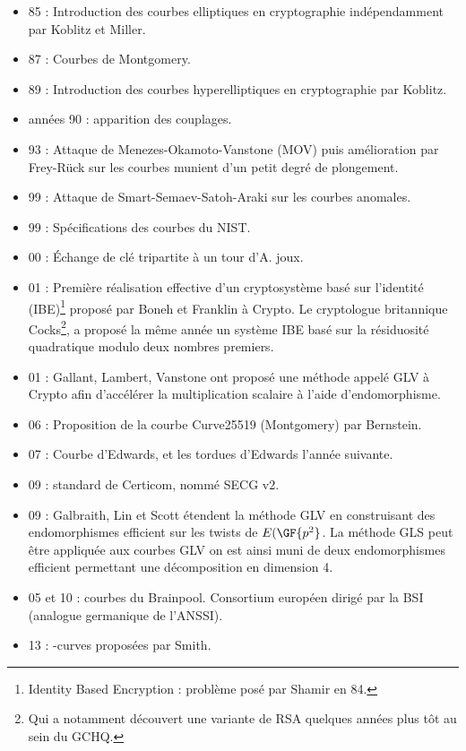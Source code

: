 \begin{itemize}
\item 85 : Introduction des courbes elliptiques en cryptographie indépendamment par Koblitz et Miller.
\item 87 : Courbes de Montgomery.
\item 89 : Introduction des courbes hyperelliptiques en cryptographie par Koblitz.
\item années 90 : apparition des couplages.
\item 93 : Attaque de Menezes-Okamoto-Vanstone (MOV) puis amélioration par Frey-Rück sur les courbes munient d'un petit degré de plongement.
\item 99 : Attaque de Smart-Semaev-Satoh-Araki sur les courbes anomales.
\item 99 : Spécifications des courbes du NIST.
\item 00 : \'Echange de clé tripartite à un tour d'A. joux.
\item 01 : Première réalisation effective d'un cryptosystème basé sur l'identité (IBE)\footnote{Identity Based Encryption : problème posé par Shamir en 84.} proposé par Boneh et Franklin à Crypto. Le cryptologue britannique Cocks\footnote{Qui a notamment découvert une variante de RSA quelques années plus tôt au sein du GCHQ.}, a proposé la même année un système IBE basé sur la résiduosité quadratique modulo deux nombres premiers.
\item 01 : Gallant, Lambert, Vanstone ont proposé une méthode appelé GLV à Crypto afin d'accélérer la multiplication scalaire à l'aide d'endomorphisme.
\item 06 : Proposition de la courbe Curve25519 (Montgomery) par Bernstein. 
\item 07 : Courbe d'Edwards, et les tordues d'Edwards l'année suivante.
\item 09 : standard de Certicom, nommé SECG v2.
\item 09 : Galbraith, Lin et Scott étendent la méthode GLV en construisant des endomorphismes efficient sur les twists de $E(\GF{p^2}$. La méthode GLS peut être appliquée aux courbes GLV on est ainsi muni de deux endomorphismes efficient permettant une décomposition en dimension 4.
\item 05 et 10 : courbes du Brainpool. Consortium européen dirigé par la BSI (analogue germanique de l'ANSSI).
\item 13 : \Q{}-curves proposées par Smith.
\end{itemize}